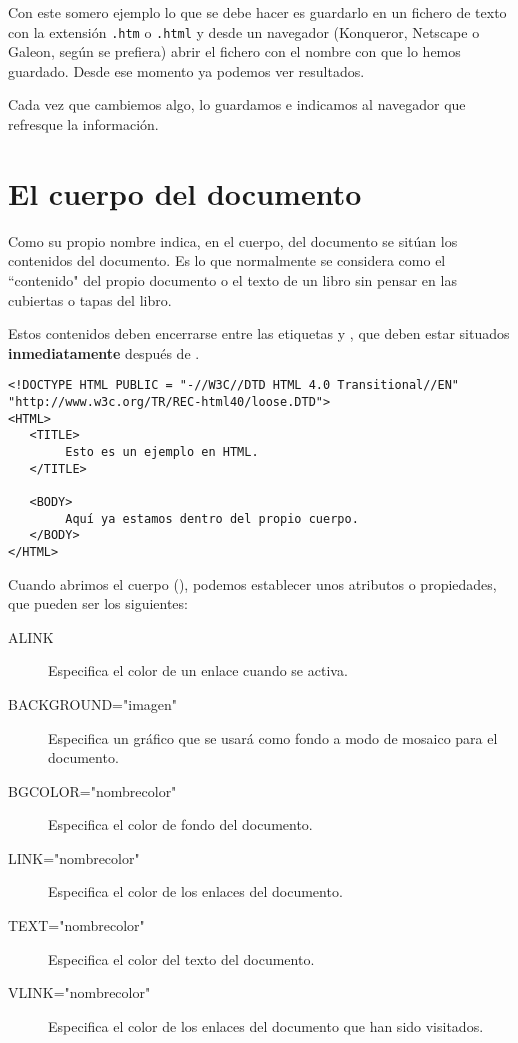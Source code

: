 Con  este somero  ejemplo lo  que  se debe  hacer es  guardarlo en  un
fichero de texto con la extensión {\tt  .htm} o {\tt .html} y desde un
navegador (Konqueror,  Netscape o Galeon, según  se prefiera) abrir el
fichero con el nombre con que lo hemos guardado.
Desde ese momento ya podemos ver resultados.

Cada vez que cambiemos algo, lo guardamos e indicamos al navegador que
refresque la información.


\section{El cuerpo del documento}

Como su  propio nombre indica, en  el cuerpo, del documento  se sitúan
los contenidos del documento. Es  lo que normalmente se considera como
el ``contenido" del propio  documento o el  texto de un  libro sin
pensar en las cubiertas o tapas del libro.

Estos contenidos  deben encerrarse  entre las etiquetas   y
, que deben estar situados {\bf inmediatamente} después de
.

\begin{verbatim}
<!DOCTYPE HTML PUBLIC = "-//W3C//DTD HTML 4.0 Transitional//EN"
"http://www.w3c.org/TR/REC-html40/loose.DTD">
<HTML>
   <TITLE>
        Esto es un ejemplo en HTML.
   </TITLE>

   <BODY>
        Aquí ya estamos dentro del propio cuerpo.
   </BODY>
</HTML>
\end{verbatim}

Cuando  abrimos  el  cuerpo  (),  podemos  establecer  unos
atributos o propiedades, que pueden ser los siguientes:

\begin{description}

\item[ALINK] Especifica el color de un enlace cuando se activa.

\item[BACKGROUND="imagen"]  Especifica un  gráfico que  se usará  como
fondo a modo de mosaico para el documento.

\item[BGCOLOR="nombrecolor"]   Especifica  el   color  de   fondo  del
documento.

\item[LINK="nombrecolor"]  Especifica  el  color de  los  enlaces  del
documento.

\item[TEXT="nombrecolor"] Especifica el color del texto del documento.

\item[VLINK="nombrecolor"]  Especifica el  color  de  los enlaces  del
documento que han sido visitados.

\end{description}

